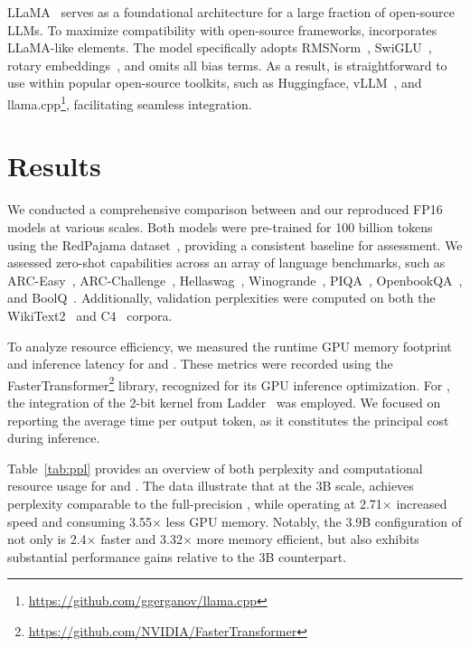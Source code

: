 LLaMA~\cite{llama, llama2} serves as a foundational architecture for a large fraction of open-source LLMs. To maximize compatibility with open-source frameworks,  incorporates LLaMA-like elements. The model specifically adopts RMSNorm~\cite{rmsnorm}, SwiGLU~\cite{swiglu}, rotary embeddings~\cite{rope}, and omits all bias terms. As a result,  is straightforward to use within popular open-source toolkits, such as Huggingface, vLLM~\cite{vllm}, and llama.cpp\footnote{\url{https://github.com/ggerganov/llama.cpp}}, facilitating seamless integration.

\section{Results}

We conducted a comprehensive comparison between  and our reproduced FP16  models at various scales. Both models were pre-trained for 100 billion tokens using the RedPajama dataset~\cite{redpajama}, providing a consistent baseline for assessment. We assessed zero-shot capabilities across an array of language benchmarks, such as ARC-Easy~\cite{arc}, ARC-Challenge~\cite{arc}, Hellaswag~\cite{hellaswag}, Winogrande~\cite{winoGrande}, PIQA~\cite{piqa}, OpenbookQA~\cite{openbookqa}, and BoolQ~\cite{boolq}. Additionally, validation perplexities were computed on both the WikiText2~\cite{wikitext2} and C4~\cite{c4} corpora.

To analyze resource efficiency, we measured the runtime GPU memory footprint and inference latency for  and . These metrics were recorded using the FasterTransformer\footnote{\url{https://github.com/NVIDIA/FasterTransformer}} library, recognized for its GPU inference optimization. For , the integration of the 2-bit kernel from Ladder~\cite{ladder} was employed. We focused on reporting the average time per output token, as it constitutes the principal cost during inference.

Table~\ref{tab:ppl} provides an overview of both perplexity and computational resource usage for  and . The data illustrate that at the 3B scale,  achieves perplexity comparable to the full-precision , while operating at 2.71$\times$ increased speed and consuming 3.55$\times$ less GPU memory. Notably, the 3.9B configuration of  not only is 2.4$\times$ faster and 3.32$\times$ more memory efficient, but also exhibits substantial performance gains relative to the  3B counterpart.

